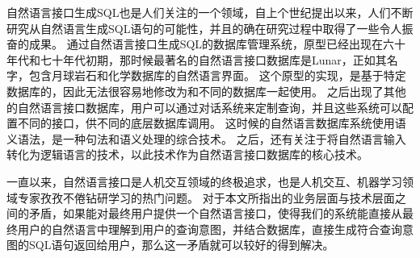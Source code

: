 
自然语言接口生成SQL也是人们关注的一个领域\cite{Androutsopoulos1995Natural}，自上个世纪提出以来，人们不断研究从自然语言生成SQL语句的可能性，并且的确在研究过程中取得了一些令人振奋的成果。
通过自然语言接口生成SQL的数据库管理系统，原型已经出现在六十年代和七十年代初期，那时候最著名的自然语言接口数据库是Lunar，正如其名字，包含月球岩石和化学数据库的自然语言界面。
这个原型的实现，是基于特定数据库的，因此无法很容易地修改为和不同的数据库一起使用。
之后出现了其他的自然语言接口数据库，用户可以通过对话系统来定制查询，并且这些系统可以配置不同的接口，供不同的底层数据库调用。
这时候的自然语言数据库系统使用语义语法，是一种句法和语义处理的综合技术。
之后，还有关注于将自然语言输入转化为逻辑语言的技术，以此技术作为自然语言接口数据库的核心技术。

一直以来，自然语言接口是人机交互领域的终极追求，也是人机交互、机器学习领域专家孜孜不倦钻研学习的热门问题。
对于本文所指出的业务层面与技术层面之间的矛盾，如果能对最终用户提供一个自然语言接口，使得我们的系统能直接从最终用户的自然语言中理解到用户的查询意图，并结合数据库，直接生成符合查询意图的SQL语句返回给用户，那么这一矛盾就可以较好的得到解决。

